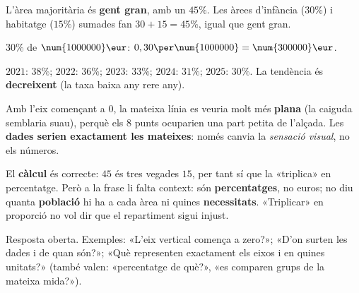\begin{solucions}
\begin{sollist}
  \item L'àrea majoritària és \textbf{gent gran}, amb un $45\%$. Les àrees d'infància
        ($30\%$) i habitatge ($15\%$) sumades fan $30+15=45\%$, igual que gent gran.
  \item $30\%$ de $\num{1000000}\eur$: $0,30\per\num{1000000}=\num{300000}\eur$.
  \item $2021$: $38\%$; $2022$: $36\%$; $2023$: $33\%$; $2024$: $31\%$; $2025$: $30\%$.
        La tendència és \textbf{decreixent} (la taxa baixa any rere any).
  \item Amb l'eix començant a $0$, la mateixa línia es veuria molt més \textbf{plana}
        (la caiguda semblaria suau), perquè els $8$ punts ocuparien una part petita de
        l'alçada. Les \textbf{dades serien exactament les mateixes}: només canvia la
        \emph{sensació visual}, no els números.
  \item El \textbf{càlcul} és correcte: $45$ és tres vegades $15$, per tant sí que la
        «triplica» en percentatge. Però a la frase li falta context: són
        \textbf{percentatges}, no euros; no diu quanta \textbf{població} hi ha a cada
        àrea ni quines \textbf{necessitats}. «Triplicar» en proporció no vol dir que el
        repartiment sigui injust.
  \item Resposta oberta. Exemples: «L'eix vertical comença a zero?»; «D'on surten les
        dades i de quan són?»; «Què representen exactament els eixos i en quines
        unitats?» (també valen: «percentatge de què?», «es comparen grups de la mateixa
        mida?»).
\end{sollist}
\end{solucions}
